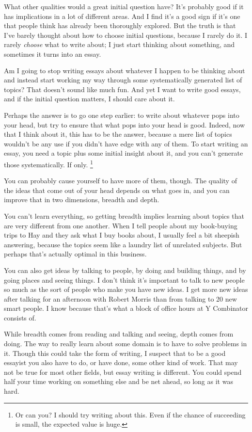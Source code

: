 What other qualities would a great initial question have? It's probably
good if it has implications in a lot of different areas. And I find it's
a good sign if it's one that people think has already been thoroughly
explored. But the truth is that I've barely thought about how to choose
initial questions, because I rarely do it. I rarely \emph{choose} what
to write about; I just start thinking about something, and sometimes it
turns into an essay.

Am I going to stop writing essays about whatever I happen to be thinking
about and instead start working my way through some systematically
generated list of topics? That doesn't sound like much fun. And yet I
want to write good essays, and if the initial question matters, I should
care about it.

Perhaps the answer is to go one step earlier: to write about whatever
pops into your head, but try to ensure that what pops into your head is
good. Indeed, now that I think about it, this has to be the answer,
because a mere list of topics wouldn't be any use if you didn't have
edge with any of them. To start writing an essay, you need a topic plus
some initial insight about it, and you can't generate those
systematically. If only. \footnote{Or can you? I should try writing about this. Even if the chance
of succeeding is small, the expected value is huge.}

You can probably cause yourself to have more of them, though. The
quality of the ideas that come out of your head depends on what goes in,
and you can improve that in two dimensions, breadth and depth.

You can't learn everything, so getting breadth implies learning about
topics that are very different from one another. When I tell people
about my book-buying trips to Hay and they ask what I buy books about, I
usually feel a bit sheepish answering, because the topics seem like a
laundry list of unrelated subjects. But perhaps that's actually optimal
in this business.

You can also get ideas by talking to people, by doing and building
things, and by going places and seeing things. I don't think it's
important to talk to new people so much as the sort of people who make
you have new ideas. I get more new ideas after talking for an afternoon
with Robert Morris than from talking to 20 new smart people. I know
because that's what a block of office hours at Y Combinator consists of.

While breadth comes from reading and talking and seeing, depth comes
from doing. The way to really learn about some domain is to have to
solve problems in it. Though this could take the form of writing, I
suspect that to be a good essayist you also have to do, or have done,
some other kind of work. That may not be true for most other fields, but
essay writing is different. You could spend half your time working on
something else and be net ahead, so long as it was hard.

